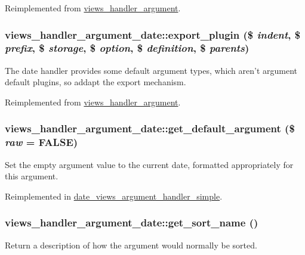 Reimplemented from \hyperlink{classviews__handler__argument_a830cb037bee2daa385618a60d01c0dd1}{views\_\-handler\_\-argument}.\hypertarget{classviews__handler__argument__date_aa4fe15a71439766a9915a47277615873}{
\subsubsection[{export\_\-plugin}]{\setlength{\rightskip}{0pt plus 5cm}views\_\-handler\_\-argument\_\-date::export\_\-plugin (\$ {\em indent}, \/  \$ {\em prefix}, \/  \$ {\em storage}, \/  \$ {\em option}, \/  \$ {\em definition}, \/  \$ {\em parents})}}
\label{classviews__handler__argument__date_aa4fe15a71439766a9915a47277615873}
The date handler provides some default argument types, which aren't argument default plugins, so addapt the export mechanism. 

Reimplemented from \hyperlink{classviews__handler__argument_abf6991bce1b9311bbfc3d471df49434e}{views\_\-handler\_\-argument}.\hypertarget{classviews__handler__argument__date_a1e5320e475b9e86ed9acc59c9a525610}{
\subsubsection[{get\_\-default\_\-argument}]{\setlength{\rightskip}{0pt plus 5cm}views\_\-handler\_\-argument\_\-date::get\_\-default\_\-argument (\$ {\em raw} = {\ttfamily FALSE})}}
\label{classviews__handler__argument__date_a1e5320e475b9e86ed9acc59c9a525610}
Set the empty argument value to the current date, formatted appropriately for this argument. 

Reimplemented in \hyperlink{classdate__views__argument__handler__simple_ad4843a30369e2de82db47c204167cbb0}{date\_\-views\_\-argument\_\-handler\_\-simple}.\hypertarget{classviews__handler__argument__date_ab206fc9897b6b15df9b96ffb95c59cb5}{
\subsubsection[{get\_\-sort\_\-name}]{\setlength{\rightskip}{0pt plus 5cm}views\_\-handler\_\-argument\_\-date::get\_\-sort\_\-name ()}}
\label{classviews__handler__argument__date_ab206fc9897b6b15df9b96ffb95c59cb5}
Return a description of how the argument would normally be sorted.

